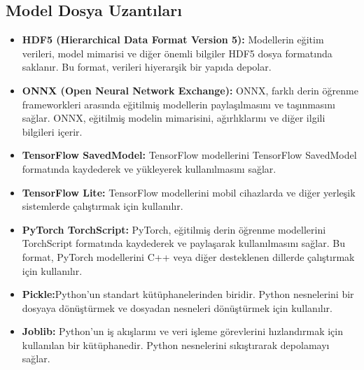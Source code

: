 \subsection{Model Dosya Uzantıları}
\begin{itemize}
    \item \textbf{HDF5 (Hierarchical Data Format Version 5):} Modellerin eğitim verileri, model mimarisi ve diğer önemli bilgiler HDF5 dosya formatında saklanır. Bu format, verileri hiyerarşik bir yapıda depolar.
    \item \textbf{ONNX (Open Neural Network Exchange):} ONNX, farklı derin öğrenme frameworkleri arasında eğitilmiş modellerin paylaşılmasını ve taşınmasını sağlar. ONNX, eğitilmiş modelin mimarisini, ağırlıklarını ve diğer ilgili bilgileri içerir.
    \item \textbf{TensorFlow SavedModel:} TensorFlow modellerini TensorFlow SavedModel formatında kaydederek ve yükleyerek kullanılmasını sağlar.
    \item \textbf{TensorFlow Lite:} TensorFlow modellerini mobil cihazlarda ve diğer yerleşik sistemlerde çalıştırmak için kullanılır.
    \item \textbf{PyTorch TorchScript:} PyTorch, eğitilmiş derin öğrenme modellerini TorchScript formatında kaydederek ve paylaşarak kullanılmasını sağlar. Bu format, PyTorch modellerini C++ veya diğer desteklenen dillerde çalıştırmak için kullanılır. 
    \item \textbf{Pickle:}Python'un standart kütüphanelerinden biridir. Python nesnelerini bir dosyaya dönüştürmek ve dosyadan nesneleri dönüştürmek için kullanılır. 
    \item \textbf{Joblib:} Python'un iş akışlarını ve veri işleme görevlerini hızlandırmak için kullanılan bir kütüphanedir. Python nesnelerini sıkıştırarak depolamayı sağlar.
\end{itemize}

\newpage 